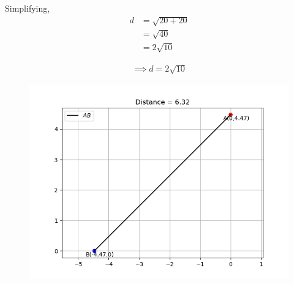 \documentclass[journal]{IEEEtran}
\begin{document}
Simplifying,
\begin{align}
d &= \sqrt{20 + 20} \\
  &= \sqrt{40} \\
  &= 2\sqrt{10}
\end{align}

\begin{align}
\implies d = \boxed{2\sqrt{10}}
\end{align}

\begin{figure}
    \centering
    \includegraphics[width=0.8\columnwidth]{figs/Figure_1.png}
    \label{fig:placeholder}
\end{figure}
\end{document}
